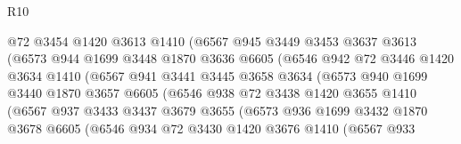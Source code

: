 \begin{lexlean}{R10}
\begin{coremodule}
                        @72
                        @3454
                        @1420
                        @3613
                        @1410
                        (@6567
                          @945
                          @3449
                          @3453
                          @3637
                          @3613
                          (@6573
                            @944
                            @1699
                            @3448
                            @1870
                            @3636
                            @6605
                            (@6546
                              @942
                              @72
                              @3446
                              @1420
                              @3634
                              @1410
                              (@6567
                                @941
                                @3441
                                @3445
                                @3658
                                @3634
                                (@6573
                                  @940
                                  @1699
                                  @3440
                                  @1870
                                  @3657
                                  @6605
                                  (@6546
                                    @938
                                    @72
                                    @3438
                                    @1420
                                    @3655
                                    @1410
                                    (@6567
                                      @937
                                      @3433
                                      @3437
                                      @3679
                                      @3655
                                      (@6573
                                        @936
                                        @1699
                                        @3432
                                        @1870
                                        @3678
                                        @6605
                                        (@6546
                                          @934
                                          @72
                                          @3430
                                          @1420
                                          @3676
                                          @1410
                                          (@6567
                                            @933

\end{coremodule}
\end{lexlean}
